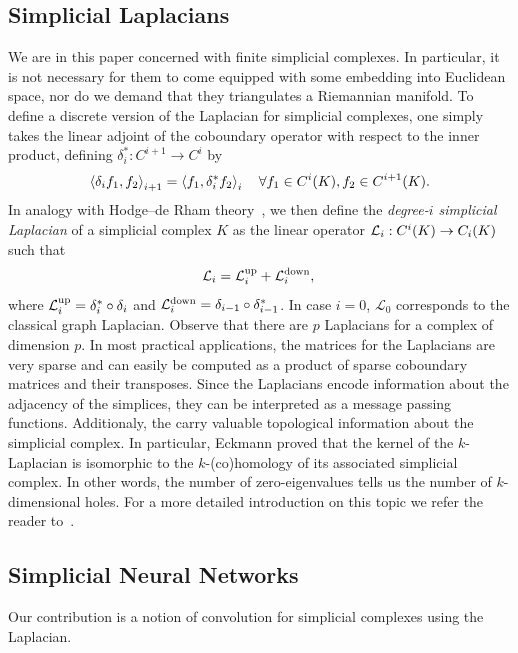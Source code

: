 \subsection{Simplicial Laplacians}
We are in this paper concerned with finite simplicial complexes. In particular, it is not necessary for them to come equipped with some embedding into Euclidean space, nor do we demand that they triangulates a Riemannian manifold. To define a discrete version of the Laplacian for simplicial complexes, one simply takes the linear adjoint of the coboundary operator with respect to the inner product, defining $\delta_i^\ast:C^{i+1}\to C^i$ by
\begin{align*}
  \left\langle \delta_i f_1 , f_2 \right\rangle_{i+1} =\left\langle f_1 , \delta_i^\ast f_2 \right\rangle_{i} \quad \forall f_1\in C^{i}(K), f_2 \in C^{i+1}(K).
\end{align*}
In analogy with Hodge--de Rham theory~\cite{madsen1997calculus}, we then define the \emph{degree-$i$ simplicial Laplacian} of a simplicial complex $K$ as the linear operator $\mathcal{L}_i:C^i(K)\to C_i(K)$ such that
\begin{equation*}
  \mathcal{L}_i = \mathcal{L}^{\text{up}}_i + \mathcal{L}^{\text{down}}_i,\\
\end{equation*}
where $\mathcal{L}^{\text{up}}_i =  \delta_{i}^\ast\circ\delta_{i}$ and $\mathcal{L}^{\text{down}}_i = \delta_{i-1}\circ\delta_{i-1}^\ast$. In case $i=0$, $\mathcal{L}_0$ corresponds to the classical graph Laplacian. Observe that there are $p$ Laplacians for a complex of dimension $p$. In most practical applications, the matrices for the Laplacians are very sparse and can easily be computed as a product of sparse coboundary matrices and their transposes. Since the Laplacians encode information about the adjacency of the simplices, they can be interpreted as a message passing functions. Additionaly, the carry valuable topological information about the simplicial complex. In particular, Eckmann \cite{eckmann1944} proved that the kernel of the $k$-Laplacian is isomorphic to the $k$-(co)homology of its associated simplicial complex. In other words, the number of zero-eigenvalues tells us the number of $k$-dimensional holes. For a more detailed introduction on this topic we refer the reader to~\cite{horak2013spectra}.
\subsection{Simplicial Neural Networks}
Our contribution is a notion of convolution for simplicial complexes using the Laplacian.


